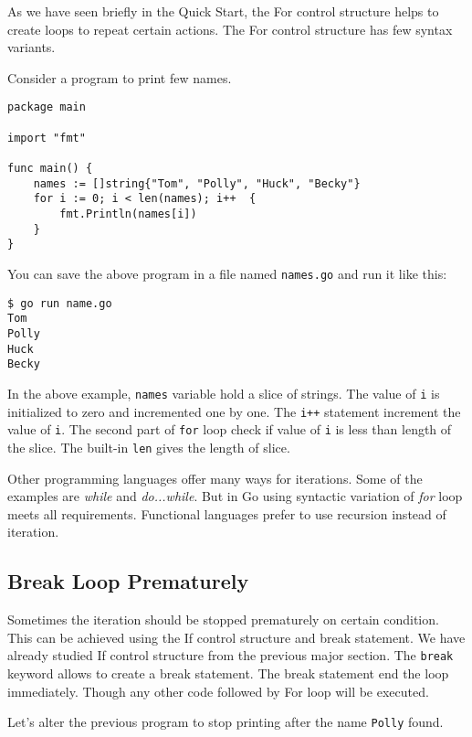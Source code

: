 As we have seen briefly in the Quick Start, the For control structure
helps to create loops to repeat certain actions. The For control structure has
few syntax variants.

Consider a program to print few names.

\begin{lstlisting}[caption=For loop example (forbasic.go)]
package main

import "fmt"

func main() {
    names := []string{"Tom", "Polly", "Huck", "Becky"}
    for i := 0; i < len(names); i++  {
        fmt.Println(names[i])
    }
}
\end{lstlisting}

You can save the above program in a file named \texttt{names.go}
and run it like this:

\begin{lstlisting}[numbers=none]
$ go run name.go
Tom
Polly
Huck
Becky
\end{lstlisting}

In the above example, \texttt{names} variable hold a slice of strings.
The value of \texttt{i} is initialized to zero and incremented one by
one.  The \texttt{i++} statement increment the value of \texttt{i}.
The second part of \texttt{for} loop check if value of \texttt{i} is
less than length of the slice.  The built-in \texttt{len} gives the
length of slice.

Other programming languages offer many ways for iterations. Some of
the examples are \textit{while} and \textit{do...while}.  But in Go
using syntactic variation of \textit{for} loop meets all requirements.
Functional languages prefer to use recursion instead of iteration.

\subsection{Break Loop Prematurely}

Sometimes the iteration should be stopped prematurely on certain
condition.  This can be achieved using the If control structure and
break statement.  We have already studied If control structure from
the previous major section. The \texttt{break} keyword allows to
create a break statement.  The break statement end the
loop immediately.  Though any other code followed by For loop will be
executed.

Let's alter the previous program to stop printing after the
name \texttt{Polly} found.

